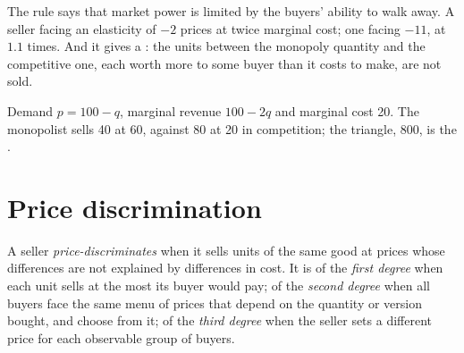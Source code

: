 The rule says that market power is limited by the buyers' ability to walk
away. A seller facing an elasticity of $-2$ prices at twice marginal cost;
one facing $-11$, at $1.1$ times. And it gives a : the units
between the monopoly quantity and the competitive one, each worth more to
some buyer than it costs to make, are not sold.

\begin{omfigure}

{\small Demand $p = 100 - q$, marginal revenue $100 - 2q$ and marginal cost 20.
The monopolist sells 40 at 60, against 80 at 20 in competition; the
triangle, 800, is the .}
\end{omfigure}

\section{Price discrimination}\label{sec:b1:monopoly-pricing:discrimination}

\begin{definition}\label{def:b1:monopoly-pricing:discrimination}
A seller \emph{price-discriminates} when it sells units of the same good at
prices whose differences are not explained by differences in cost. It is
of the \emph{first degree} when each unit sells at the most its buyer would
pay; of the \emph{second degree} when all buyers face the same menu of
prices that depend on the quantity or version bought, and choose from it;
of the \emph{third degree} when the seller sets a different price for each
observable group of buyers.
\end{definition}

